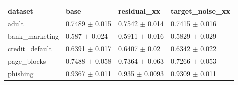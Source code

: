 \begin{tabular}{llll}
\toprule
dataset & base & residual\_xx & target\_noise\_xx \\
\midrule
adult & 0.7489 $\pm$ 0.015 & 0.7542 $\pm$ 0.014 & 0.7415 $\pm$ 0.016 \\
bank\_marketing & 0.587 $\pm$ 0.024 & 0.5911 $\pm$ 0.016 & 0.5829 $\pm$ 0.029 \\
credit\_default & 0.6391 $\pm$ 0.017 & 0.6407 $\pm$ 0.02 & 0.6342 $\pm$ 0.022 \\
page\_blocks & 0.7488 $\pm$ 0.058 & 0.7364 $\pm$ 0.063 & 0.7266 $\pm$ 0.053 \\
phishing & 0.9367 $\pm$ 0.011 & 0.935 $\pm$ 0.0093 & 0.9309 $\pm$ 0.011 \\
\bottomrule
\end{tabular}

